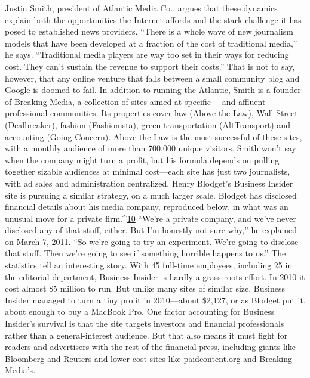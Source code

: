 Justin Smith, president of Atlantic Media Co., argues that these dynamics explain
both the opportunities the Internet affords and the stark challenge it has
posed to established news providers. ``There is a whole wave of new journalism
models that have been developed at a fraction of the cost of traditional media,''
he says. ``Traditional media players are way too set in their ways for reducing cost.
They can't sustain the revenue to support their costs.''
That is not to say, however, that any online venture that falls between a small
community blog and Google is doomed to fail. In addition to running the Atlantic,
Smith is a founder of Breaking Media, a collection of sites aimed at specific—
and affluent—professional communities. Its properties cover law (Above
the Law), Wall Street (Dealbreaker), fashion (Fashionista), green transportation
(AltTransport) and accounting (Going Concern). Above the Law is the most
successful of these sites, with a monthly audience of more than 700,000 unique
visitors. Smith won't say when the company might turn a profit, but his formula
depends on pulling together sizable audiences at minimal cost—each site has just
two journalists, with ad sales and administration centralized.
Henry Blodget's Business Insider site is pursuing a similar strategy, on a much
larger scale. Blodget has disclosed financial details about his media company, reproduced
below, in what was an unusual move for a private firm.^{\href{#endnotes-chapter-7}{10}} ``We're a private
company, and we've never disclosed any of that stuff, either. But I'm honestly
not sure why,'' he explained on March 7, 2011. ``So we're going to try an experiment.
We're going to disclose that stuff. Then we're going to see if something
horrible happens to us.''
The statistics tell an interesting story. With 45 full-time employees, including
25 in the editorial department, Business Insider is hardly a grass-roots effort. In
2010 it cost almost \$5 million to run. But unlike many sites of similar size, Business
Insider managed to turn a tiny profit in 2010—about \$2,127, or as Blodget
put it, about enough to buy a MacBook Pro.
One factor accounting for Business Insider's survival is that the site targets
investors and financial professionals rather than a general-interest audience. But
that also means it must fight for readers and advertisers with the rest of the financial
press, including giants like Bloomberg and Reuters and lower-cost sites like
paidcontent.org and Breaking Media's.

